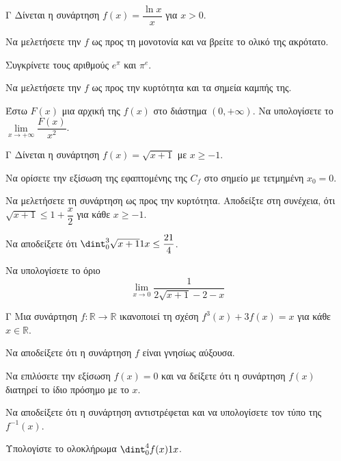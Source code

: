 \begin{thema}{Γ}
Δίνεται η συνάρτηση $f(x) = \dfrac{\ln x}{x}$ για $x > 0$.
\begin{erwthma}
  \item Να μελετήσετε την $f$ ως προς τη μονοτονία και να βρείτε το ολικό της ακρότατο.
  \item Συγκρίνετε τους αριθμούς $e^\pi$ και $\pi^e$.
  \item Να μελετήσετε την $f$ ως προς την κυρτότητα και τα σημεία καμπής της.
  \item Έστω $F(x)$ μια αρχική της $f(x)$ στο διάστημα $(0, +\infty)$. Να υπολογίσετε το $\lim\limits_{x \to +\infty} \dfrac{F(x)}{x^2}$.
\end{erwthma}
\end{thema}

\begin{thema}{Γ}
Δίνεται η συνάρτηση $f(x) = \sqrt{x+1}$ με $x \ge -1$. 
\begin{erwthma}
  \item Να ορίσετε την εξίσωση της εφαπτομένης της $C_f$ στο σημείο με τετμημένη $x_0=0$.
  \item Να μελετήσετε τη συνάρτηση ως προς την κυρτότητα. Αποδείξτε στη συνέχεια, ότι $\sqrt{x+1} \le 1 + \dfrac{x}{2}$ για κάθε $x \ge -1$.
  \item Να αποδείξετε ότι $\dint_0^3 \sqrt{x+1} \d x \le \dfrac{21}{4}$.
  \item Να υπολογίσετε το όριο
\[\lim\limits_{x\to 0}{\dfrac{1}{2\sqrt{x+1}-2-x}}\]
\end{erwthma}
\end{thema}

\begin{thema}{Γ}
Μια συνάρτηση $f: \mathbb{R} \to \mathbb{R}$ ικανοποιεί τη σχέση $f^3(x) + 3f(x) = x$ για κάθε $x \in \mathbb{R}$.
\begin{erwthma}
  \item Να αποδείξετε ότι η συνάρτηση $f$ είναι γνησίως αύξουσα. 
  \item Να επιλύσετε την εξίσωση $f(x) = 0$ και να δείξετε ότι η συνάρτηση $f(x)$ διατηρεί το ίδιο πρόσημο με το $x$.
  \item Να αποδείξετε ότι η συνάρτηση αντιστρέφεται και να υπολογίσετε τον τύπο της $f^{-1}(x)$.
  \item Υπολογίστε το ολοκλήρωμα $\dint_0^4 f(x)\d x$.
\end{erwthma}
\end{thema}

